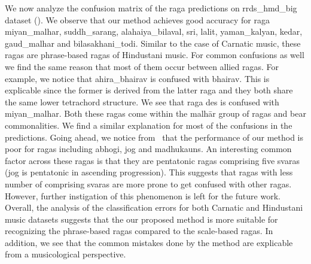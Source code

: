 We now analyze the confusion matrix of the \gls{raga} predictions on \acrshort{rrds_hmd_big} dataset (). We observe that our method achieves good accuracy for \gls{raga} \gls{miyan_malhar}, \gls{suddh_sarang}, \gls{alahaiya_bilaval}, \gls{sri}, \gls{lalit}, \gls{yaman_kalyan}, \gls{kedar}, \gls{gaud_malhar} and \gls{bilasakhani_todi}. Similar to the case of Carnatic music, these \glspl{raga} are phrase-based \glspl{raga} of Hindustani music. For common confusions as well we find the same reason that most of them occur between allied \glspl{raga}. For example, we notice that \gls{ahira_bhairav} is confused with \gls{bhairav}. This is explicable since the former is derived from the latter \gls{raga} and they both share the same lower tetrachord structure. We see that \gls{raga} \gls{des} is confused with \gls{miyan_malhar}. Both these \glspl{raga} come within the malh\={a}r group of \glspl{raga} and bear commonalities. We find a similar explanation for most of the confusions in the predictions. Going ahead, we notice from~ that the performance of our method is poor for \glspl{raga} including \gls{abhogi}, \gls{jog} and \gls{madhukauns}. An interesting common factor across these \glspl{raga} is that they are pentatonic \glspl{raga} comprising five \glspl{svara} (\gls{jog} is pentatonic in ascending progression). This suggests that \glspl{raga} with less number of comprising \glspl{svara} are more prone to get confused with other \glspl{raga}. However, further instigation of this phenomenon is left for the future work. Overall, the analysis of the classification errors for both Carnatic and Hindustani music datasets suggests that the our proposed method is more suitable for recognizing the phrase-based \glspl{raga} compared to the scale-based \glspl{raga}. In addition, we see that the common mistakes done by the method are explicable from a musicological perspective. 


